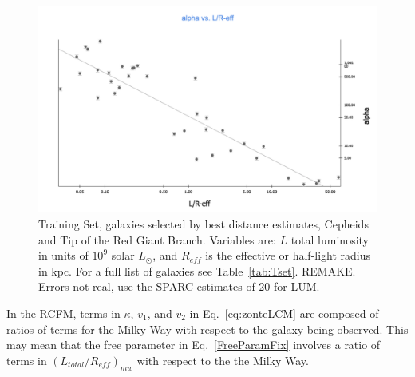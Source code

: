 \documentclass[reprint,%
 amsmath,amssymb,
 aps,
]{revtex4-1}
\begin{document}
 \begin{figure}
\includegraphics[width=\linewidth]{figures/alphavL_Reff2_8_23.png} 
\caption{  Training Set, galaxies selected by best distance estimates,   Cepheids and Tip of the Red Giant Branch.  Variables are:   $L$ total luminosity   in units of $10^9$ solar  $L_\odot$,  and  $R_{eff}$ is the effective or half-light radius in kpc.
For a full list of galaxies see  Table~\ref{tab:Tset}.  {\color{blue}REMAKE.  Errors not real,   use the  SPARC estimates of 20 for LUM}.  }
\label{alpha2}
\end{figure}  
 
In the  RCFM, terms in   $\kappa$, $ v_1$, and $ v_2$  in Eq.~\ref{eq:zonteLCM} 
are composed of 
ratios of terms for    the Milky Way with respect to  the galaxy being observed. This may mean that the free parameter in Eq.~\ref{FreeParamFix}  involves a ratio of terms in $(L_{total}/R_{eff})_{mw} $ with respect to the
 the Milky Way.
  

 
\end{document}

